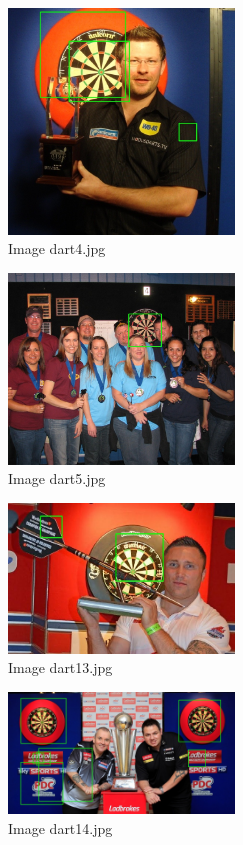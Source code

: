 \documentclass[conference]{IEEEtran}
\begin{document}
\begin{figure}[ht!]
\centering
\includegraphics[width=60mm]{img/detected_dart4.jpg}
\caption{Image dart4.jpg \label{img_face_4}}
\end{figure}

\begin{figure}[ht!]
\centering
\includegraphics[width=60mm]{img/detected_dart5.jpg}
\caption{Image dart5.jpg \label{img_face_5}}
\end{figure}

\begin{figure}[ht!]
\centering
\includegraphics[width=60mm]{img/detected_dart13.jpg}
\caption{Image dart13.jpg \label{img_face_13}}
\end{figure}

\begin{figure}[ht!]
\centering
\includegraphics[width=60mm]{img/detected_dart14.jpg}
\caption{Image dart14.jpg \label{img_face_14}}
\end{figure}
\end{document}
